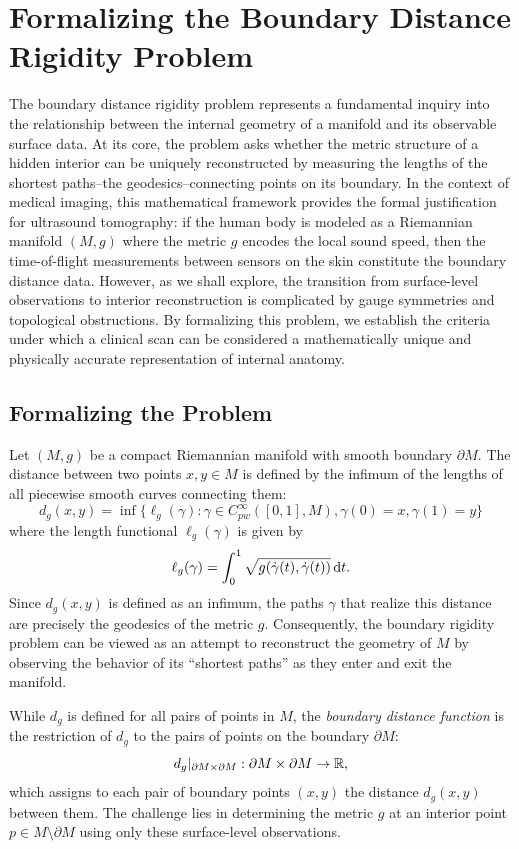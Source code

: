 \section{Formalizing the Boundary Distance Rigidity Problem}
\label{sec:formalizing_the_boundary_distance_rigidity_problem}

The boundary distance rigidity problem represents a fundamental inquiry into the relationship between the internal geometry of a manifold and its observable surface data. At its core, the problem asks whether the metric structure of a hidden interior can be uniquely reconstructed by measuring the lengths of the shortest paths--the geodesics--connecting points on its boundary. In the context of medical imaging, this mathematical framework provides the formal justification for ultrasound tomography: if the human body is modeled as a Riemannian manifold $(M, g)$ where the metric $g$ encodes the local sound speed, then the time-of-flight measurements between sensors on the skin constitute the boundary distance data. However, as we shall explore, the transition from surface-level observations to interior reconstruction is complicated by gauge symmetries and topological obstructions. By formalizing this problem, we establish the criteria under which a clinical scan can be considered a mathematically unique and physically accurate representation of internal anatomy.

\subsection{Formalizing the Problem} Let $(M, g)$ be a compact Riemannian manifold with smooth boundary $\partial M$. The distance between two points $x, y \in M$ is defined by the infimum of the lengths of all piecewise smooth curves connecting them:
\begin{equation}
  d_g(x, y) = \inf \{\ell_g(\gamma) : \gamma \in C_{pw}^\infty([0, 1], M), \gamma(0) = x, \gamma(1) = y\}
\end{equation}
where the length functional $\ell_g(\gamma)$ is given by
\[%
  \ell_g(\gamma) = \int_0^1 \sqrt{g(\dot{\gamma}(t), \dot{\gamma}(t))} \dt
.\]%
Since $d_g(x, y)$ is defined as an infimum, the paths $\gamma$ that realize this distance are precisely the geodesics of the metric $g$. Consequently, the boundary rigidity problem can be viewed as an attempt to reconstruct the geometry of $M$ by observing the behavior of its ``shortest paths'' as they enter and exit the manifold.

While $d_g$ is defined for all pairs of points in $M$, the \emph{boundary distance function} is the restriction of $d_g$ to the pairs of points on the boundary $\partial M$:
\begin{equation}
  d_g|_{\partial M \times \partial M} : \partial M \times \partial M \rightarrow \mathbb{R}
,\end{equation}
which assigns to each pair of boundary points $(x, y)$ the distance $d_g(x, y)$ between them. The challenge lies in determining the metric $g$ at an interior point $p \in M \setminus \partial M$ using only these surface-level observations.

